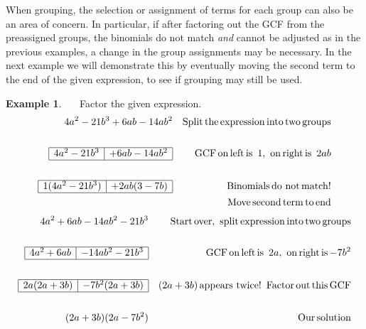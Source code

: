 \documentclass[12pt]{book}
\theoremstyle{definition}
\newtheorem{example}{Example}
\newcommand{\tmop}[1]{\ensuremath{\operatorname{#1}}}
\begin{document}
When grouping, the selection or assignment of terms for each group can also be an area of concern.  In particular, if after factoring out the GCF from the preassigned groups, the binomials do not match \textit{and} cannot be adjusted as in the previous examples, a change in the group assignments may be necessary.  In the next example we will demonstrate this by eventually moving the second term to the end of the given expression, to see if grouping may still be used.

\begin{example}~~~Factor the given expression.
  \begin{eqnarray*}
    4 a^2 - 21 b^3 + 6 a b - 14 a b^2 &  & \tmop{Split} \tmop{the}
    \tmop{expression} \tmop{into} \tmop{two} \tmop{groups}\\
    &&\\
	 \begin{array}{|l|l|}
      \hline
      4 a^2 - 21 b^3 & + 6 a b - 14 a b^2\\
      \hline
    \end{array} &  & \tmop{GCF} \tmop{on} \tmop{left} \tmop{is~} 1, \tmop{~on}
    \tmop{right} \tmop{is~} 2 a b\\
   &&\\
	  \begin{array}{|l|l|}
      \hline
      1 (4 a^2 - 21 b^3) & + 2 a b (3 - 7 b)\\
      \hline
    \end{array} &  & \tmop{Binomials} \tmop{do~not} \tmop{match} !\\
		&&\tmop{~~~Move}
    \tmop{second} \tmop{term} \tmop{to} \tmop{end}
  \end{eqnarray*}
  \begin{eqnarray*}
    4 a^2 + 6 a b - 14 a b^2 - 21 b^3 &  & \tmop{Start} \tmop{over},
    \tmop{~split} \tmop{expression} \tmop{into} \tmop{two}
    \tmop{groups}\\
   &&\\
	  \begin{array}{|l|l|}
      \hline
      4 a^2 + 6 ab & - 14 a b^2 - 21 b^3\\
      \hline
    \end{array} &  & \tmop{GCF} \tmop{on} \tmop{left} \tmop{is~} 2 a, \tmop{~on}
    \tmop{right} \tmop{is} - 7 b^2\\
   &&\\
	  \begin{array}{|l|l|}
      \hline
      2 a (2 a + 3 b) & - 7 b^2 (2 a + 3 b)\\
      \hline
    \end{array} &  & (2 a + 3 b) \tmop{appears~twice} !
    \tmop{~Factor} \tmop{out} \tmop{this} \tmop{GCF}\\
   &&\\
	  (2 a + 3 b) (2 a - 7 b^2) &  & \tmop{Our} \tmop{solution}
  \end{eqnarray*}
\end{example}
\end{document}
